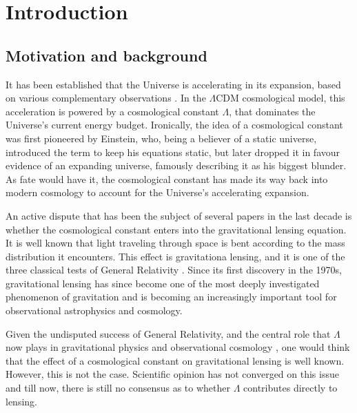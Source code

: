 \chapter{Introduction}


\section{Motivation and background}

It has been established that the Universe is accelerating in its expansion, based on various complementary observations \citep{riess2004type,spergel2003first}. In the $\Lambda \text{CDM}$ cosmological model, this acceleration is powered by a cosmological constant $\Lambda$, that dominates the Universe's current energy budget. Ironically, the idea of a cosmological constant was first pioneered by Einstein, who, being a believer of a static universe, introduced the term to keep his equations static, but later dropped it in favour evidence of an expanding universe, famously describing it as his biggest blunder. As fate would have it, the cosmological constant has made its way back into modern cosmology to account for the Universe's accelerating expansion. 

An active dispute that has been the subject of several papers in the last decade is whether the cosmological constant enters into the gravitational lensing equation. It is well known that light traveling through space is bent according to the mass distribution it encounters. This effect is gravitationa lensing, and it is one of the three classical tests of General Relativity \cite{will1993theory}. Since its first discovery in the 1970s, gravitational lensing has since become one of the most deeply investigated phenomenon of gravitation and is becoming an increasingly important tool for observational astrophysics and cosmology. 

Given the undisputed success of General Relativity, and the central role that $\Lambda$ now plays in gravitational physics and observational cosmology \citep{peebles2003cosmological}, one would think that the effect of a cosmological constant on gravitational lensing is well known. However, this is not the case. Scientific opinion has not converged on this issue and till now, there is still no consensus as to whether $\Lambda$ contributes directly to lensing. 

